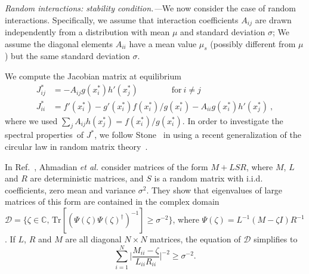 \emph{Random interactions: stability condition.---}We now consider the case of random interactions.
Specifically, we assume that interaction coefficients $A_{ij}$ are drawn independently from a distribution with mean $\mu$ and standard deviation $\sigma$;
We assume the diagonal elements $A_{ii}$ have a mean value $\mu_s$ (possibly different from $\mu$) but the same standard deviation $\sigma$. 
 
We compute the Jacobian matrix at equilibrium
\begin{align}
    J_{ij}^* & = - A_{ij}g(x_i^*)h'(x_j^*) \qquad \qquad \textrm{for} \ i\neq j \label{eq: jac off-diag}\\
    J_{ii}^* & = f'(x_i^*) - g'(x_i^*)f(x_i^*)/g(x_i^*) - A_{ii}g(x_i^*)h'(x_j^*) \ , \label{eq: jac diag}
\end{align}
where we used $\sum_{j}A_{ij}h(x_j^*)=f(x_i^*)/g(x_i^*)$.
In order to investigate the spectral properties of $J^*$, 
we follow Stone~\cite{Stone2018} in using a recent generalization of the circular law in random matrix theory~\cite{Ahmadian2015}.

In Ref.~\cite{Ahmadian2015}, Ahmadian \emph{et al.} consider matrices of the form $M + LSR$, where $M$,  
$L$ and $R$ are deterministic matrices, and $S$ is a random matrix with i.i.d. coefficients, zero mean and variance $\sigma^2$.
They show that eigenvalues of large matrices of this form are contained in the complex domain $\mathcal{D} = \{\zeta \in \mathbb{C},\, \textrm{Tr}[(\Psi(\zeta) \Psi(\zeta)^\dagger)^{-1}]\geq \sigma^{-2}\}$, where $\Psi(\zeta) = L^{-1}(M-\zeta I)R^{-1}$. If $L$, $R$ and $M$ are all diagonal $N\times N$ matrices, the equation of $\mathcal{D}$ simplifies to 
\begin{equation}
    \sum_{i=1}^N\Big\vert\frac{M_{ii} - \zeta}{L_{ii}R_{ii}}\Big\vert^{-2}\geq \sigma^{-2}.
\label{eq: domain}
\end{equation}

